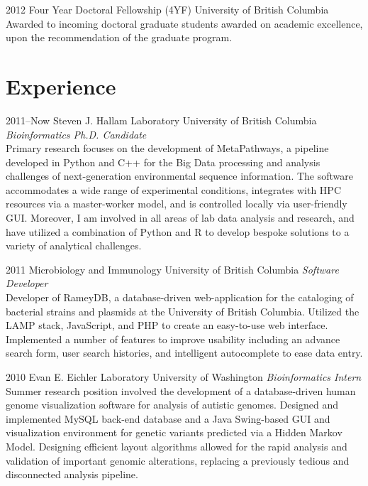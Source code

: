 \documentclass[print]{hanson_cv} %
\begin{document}
\begin{entrylist}
\entry
{2012}
{Four Year Doctoral Fellowship (4YF)}
{University of British Columbia}
{Awarded to incoming doctoral graduate students awarded on academic excellence, upon the recommendation of the graduate program.}
\end{entrylist}

\section{Experience}
\begin{entrylist}
\entry
{2011--Now}
{Steven J. Hallam Laboratory}
{University of British Columbia}
{\emph{Bioinformatics Ph.D. Candidate} \\
Primary research focuses on the development of MetaPathways, a pipeline developed in Python and C++ for the Big Data processing and analysis challenges of next-generation environmental sequence information. The software accommodates a wide range of experimental conditions, integrates with HPC resources via a master-worker model, and is controlled locally via user-friendly GUI. Moreover, I am involved in all areas of lab data analysis and research, and have utilized a combination of Python and R to develop bespoke solutions to a variety of analytical challenges.
}
\end{entrylist}
\begin{entrylist}
\entry
{2011}
{Microbiology and Immunology}
{University of British Columbia}
{\emph{Software Developer} \\
Developer of RameyDB, a database-driven web-application for the cataloging of bacterial strains and plasmids at the University of British Columbia. Utilized the LAMP stack, JavaScript, and PHP to create an easy-to-use web interface. Implemented a number of features to improve usability including an advance search form, user search histories, and intelligent autocomplete to ease data entry. }
\end{entrylist}
\begin{entrylist}
\entry
{2010}
{Evan E. Eichler Laboratory}
{University of Washington}
{\emph{Bioinformatics Intern} \\
Summer research position involved the development of a database-driven human genome visualization software for analysis of autistic genomes. Designed and implemented MySQL back-end database and a Java Swing-based GUI and visualization environment for genetic variants predicted via a Hidden Markov Model. Designing efficient layout algorithms allowed for the rapid analysis and validation of important genomic alterations, replacing a previously tedious and disconnected analysis pipeline.}
\end{entrylist}
\end{document}
